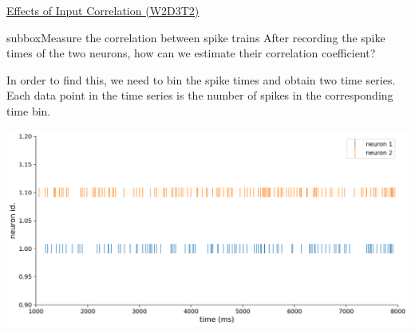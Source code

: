 \begin{textbox}{\href{https://compneuro.neuromatch.io/tutorials/W1D4_GeneralizedLinearModels/student/W1D4_Tutorial1.html}{Effects of Input Correlation (W2D3T2)} }
\begin{subbox}{subbox}{Measure the correlation between spike trains}
After recording the spike times of the two neurons, how can we estimate their correlation coefficient? 

In order to find this, we need to bin the spike times and obtain two time series. Each data point in the time series is the number of spikes in the corresponding time bin.

\begin{center}
    
\includegraphics[scale=0.14]{Figures/BNM/LIF_Figure6.png}
\end{center}

\end{subbox}
\end{textbox}

